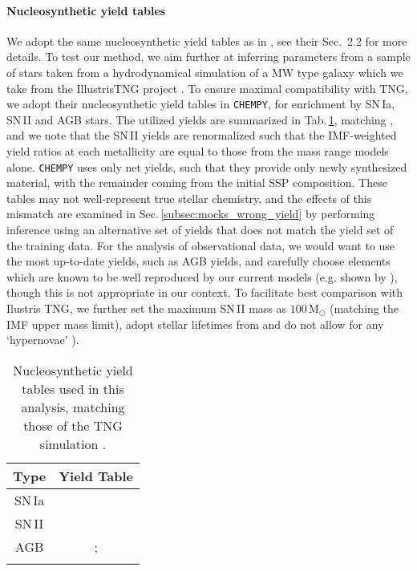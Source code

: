 \documentclass{aa}
\begin{document}
\paragraph{Nucleosynthetic yield tables}
We adopt the same nucleosynthetic yield tables as in \citep{Philcox_2019}, see their Sec.~2.2 for more details.
To test our method, we aim further at inferring parameters from a sample of stars taken from a hydrodynamical simulation of a MW type galaxy which we take from the IllustrisTNG project \citep{Pillepich2018}. To ensure maximal compatibility with TNG, we adopt their nucleosynthetic yield tables in \texttt{CHEMPY}, for enrichment by SN\,Ia, SN\,II and AGB stars. The utilized yields are summarized in Tab.\,\ref{tab:chempy_TNG_yields}, matching \citet[Tab.\,2]{2018MNRAS.473.4077P}, and we note that the SN\,II yields are renormalized such that the IMF-weighted yield ratios at each metallicity are equal to those from the \citet{2006ApJ...653.1145K} mass range models alone. \texttt{CHEMPY} uses only net yields, such that they provide only newly synthesized material, with the remainder coming from the initial SSP composition. These tables may not well-represent true stellar chemistry, and the effects of this mismatch are examined in Sec.\,\ref{subsec:mocks_wrong_yield} by performing inference using an alternative set of yields that does not match the yield set of the training data. For the analysis of observational data, we would want to use the most up-to-date yields, such as \citet{2016ApJ...825...26K} AGB yields, and carefully choose elements which are known to be well reproduced by our current models (e.g. shown by \citet{2019ApJ...874..102W,2019arXiv190806113G}), though this is not appropriate in our context. To facilitate best comparison with Ilustris TNG, we further set the maximum SN\,II mass as $100\,\mathrm{M}_\odot$ (matching the IMF upper mass limit), adopt stellar lifetimes from \citet{portinari} and do not allow for any `hypernovae' \citep[in contrary to][]{2018ApJ...861...40P}).

\begin{table}[]
\caption{Nucleosynthetic yield tables used in this analysis, matching those of the TNG simulation \citep[Tab.\,2]{2018MNRAS.473.4077P}.}
     \centering
     \begin{tabular}{c|c}
       Type & Yield Table \\
        \hline
         SN\,Ia & \citet{1997NuPhA.621..467N}\\
         SN\,II & \citet{2006ApJ...653.1145K,portinari}\\
         AGB & \citet{2010MNRAS.403.1413K,2014MNRAS.437..195D};\\
         & \citet{2014ApJ...797...44F}
     \end{tabular}
 \label{tab:chempy_TNG_yields}
 \end{table}
\end{document}
